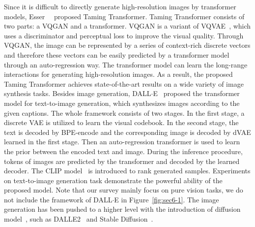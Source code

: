 Since it is difficult to directly generate high-resolution images by transformer models, Esser~\etal~ proposed Taming Transformer. Taming Transformer consists of two parts: a VQGAN and a transformer. VQGAN is a variant of VQVAE~, which uses a discriminator and perceptual loss to improve the visual quality. Through VQGAN, the image can be represented by a series of context-rich discrete vectors and therefore these vectors can be easily predicted by a transformer model through an auto-regression way. The transformer model can learn the long-range interactions for generating high-resolution images. As a result, the proposed Taming Transformer achieves state-of-the-art results on a wide variety of image synthesis tasks.
Besides image generation, DALL$\cdot$E~ proposed the transformer model for text-to-image generation, which synthesizes images according to the given captions. The whole framework consists of two stages. In the first stage, a discrete VAE is utilized to learn the visual codebook. In the second stage, the text is decoded by BPE-encode and the corresponding image is decoded by dVAE learned in the first stage. Then an auto-regression transformer is used to learn the prior between the encoded text and image. During the inference procedure, tokens of images are predicted by the transformer and decoded by the learned decoder. The CLIP model~ is introduced to rank generated samples. Experiments on text-to-image generation task demonstrate the powerful ability of the proposed model. Note that our survey mainly focus on pure vision tasks, we do not include the framework of DALL$\cdot$E in Figure~\ref{fig:sec6-1}. The image generation has been pushed to a higher level with the introduction of diffusion model~, such as DALLE2~ and Stable Diffusion~.


